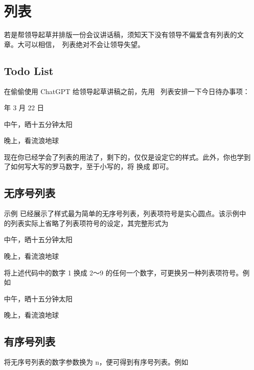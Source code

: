 \chapter{列表}

若是帮领导起草并排版一份会议讲话稿，须知天下没有领导不偏爱含有列表的文章。大可以相信，\ConTeXt\ 列表绝对不会让领导失望。

\section{Todo List}

在偷偷使用 ChatGPT 给领导起草讲稿之前，先用 \ConTeXt\ 列表安排一下今日待办事项：

 年 3 月 22 日
\startitemize
\item 中午，晒十五分钟太阳
\item 晚上，看流浪地球 \Romannumerals[2]
\stopitemize
\stopsample
{}

现在你已经学会了列表的用法了，剩下的，仅仅是设定它的样式。此外，你也学到了如何写大写的罗马数字，至于小写的，将 \type{\Romannumerals} 换成 \type{\romannumerals} 即可。

\section{无序号列表}

示例  已经展示了样式最为简单的无序号列表，列表项符号是实心圆点。该示例中的列表实际上省略了列表项符号的设定，其完整形式为

\starttyping[option=TEX]
\startitemize[1]
\item 中午，晒十五分钟太阳
\item 晚上，看流浪地球 \Romannumerals[2]
\stopitemize
\stoptyping

将上述代码中的数字 1 换成 2～9 的任何一个数字，可更换另一种列表项符号。例如

\startsample
\startitemize[8]
\item 中午，晒十五分钟太阳
\item 晚上，看流浪地球 \Romannumerals[2]
\stopitemize
\stopsample
{}

\section{有序号列表}

将无序号列表的数字参数换为 n，便可得到有序号列表。例如


